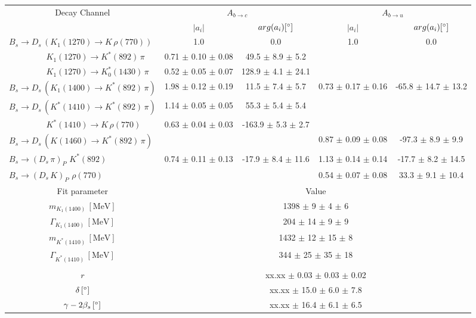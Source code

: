 \begin{tabular}{l c c c c } 
\hline
\hline
\multicolumn{1}{c}{Decay Channel} & \multicolumn{2}{c}{$A_{b \to c}$} & \multicolumn{2}{c}{$A_{b \to u}$}  \\ 
 & \multicolumn{1}{c}{$\vert a_i \vert$}  & \multicolumn{1}{c}{$arg(a_i) [^{\circ}]$}  & \multicolumn{1}{c}{$\vert a_i \vert$} & \multicolumn{1}{c}{$arg(a_i) [^{\circ}]$} \\ 
\hline
 $B_s \to D_s \, ( K_1(1270) \to K \, \rho(770) ) $ &  1.0 & 0.0 & 1.0 & 0.0  \\ 
$\phantom{B_s \to D_s \, (} K_1(1270) \to K^{*}(892) \, \pi \phantom{)} $ & 0.71 $\pm$ 0.10 $\pm$ 0.08 & 49.5 $\pm$ 8.9 $\pm$ 5.2 & &   \\ 
$\phantom{B_s \to D_s \, (} K_1(1270) \to K^{*}_{0}(1430) \, \pi \phantom{)} $ & 0.52 $\pm$ 0.05 $\pm$ 0.07 & 128.9 $\pm$ 4.1 $\pm$ 24.1 & &   \\ 
$B_s \to D_s \, ( K_1(1400) \to K^{*}(892) \, \pi ) $ & 1.98 $\pm$ 0.12 $\pm$ 0.19 & 11.5 $\pm$ 7.4 $\pm$ 5.7 & 0.73 $\pm$ 0.17 $\pm$ 0.16 & -65.8 $\pm$ 14.7 $\pm$ 13.2 \\ 
$B_s \to D_s \, ( K^{*}(1410) \to K^{*}(892) \, \pi ) $ & 1.14 $\pm$ 0.05 $\pm$ 0.05 & 55.3 $\pm$ 5.4 $\pm$ 5.4 &  &  \\ 
$\phantom{B_s \to D_s \, (} K^{*}(1410) \to K \, \rho(770) \phantom{)} $ & 0.63 $\pm$ 0.04 $\pm$ 0.03 & -163.9 $\pm$ 5.3 $\pm$ 2.7 & &   \\ 
$B_s \to D_s \, ( K(1460) \to K^{*}(892) \, \pi ) $ & & &0.87 $\pm$ 0.09 $\pm$ 0.08 & -97.3 $\pm$ 8.9 $\pm$ 9.9 \\ 
$B_s \to ( D_s \, \pi)_{P} \, \, K^{*}(892) $ & 0.74 $\pm$ 0.11 $\pm$ 0.13 & -17.9 $\pm$ 8.4 $\pm$ 11.6 & 1.13 $\pm$ 0.14 $\pm$ 0.14 & -17.7 $\pm$ 8.2 $\pm$ 14.5 \\ 
$B_s \to ( D_s \, K)_{P} \, \, \rho(770) $ & & &0.54 $\pm$ 0.07 $\pm$ 0.08 & 33.3 $\pm$ 9.1 $\pm$ 10.4 \\ 
\hline
\hline
\multicolumn{1}{c}{Fit parameter} & \multicolumn{4}{c}{Value}  \\ 
\hline
\multicolumn{1}{c}{$m_{K_1(1400)} \, [\text{MeV}]$} & \multicolumn{4}{c}{1398 $\pm$ 9 $\pm$ 4 $\pm$ 6} \\ 
\multicolumn{1}{c}{$\Gamma_{K_1(1400)} \, [\text{MeV}]$} & \multicolumn{4}{c}{204 $\pm$ 14 $\pm$ 9 $\pm$ 9} \\ 
\multicolumn{1}{c}{$m_{K^{*}(1410)} \, [\text{MeV}]$} & \multicolumn{4}{c}{1432 $\pm$ 12 $\pm$ 15 $\pm$ 8} \\ 
\multicolumn{1}{c}{$\Gamma_{K^{*}(1410)} \, [\text{MeV}]$} & \multicolumn{4}{c}{344 $\pm$ 25 $\pm$ 35 $\pm$ 18} \\ 
 \\ 
\multicolumn{1}{c}{$r$} & \multicolumn{4}{c}{xx.xx $\pm$ 0.03 $\pm$ 0.03 $\pm$ 0.02} \\ 
\multicolumn{1}{c}{$\delta \, [^{\circ}]$} & \multicolumn{4}{c}{xx.xx $\pm$ 15.0 $\pm$ 6.0 $\pm$ 7.8} \\ 
\multicolumn{1}{c}{$\gamma - 2 \beta_{s} \, [^{\circ}]$} & \multicolumn{4}{c}{xx.xx $\pm$ 16.4 $\pm$ 6.1 $\pm$ 6.5} \\ 
\hline
\hline
\end{tabular}
